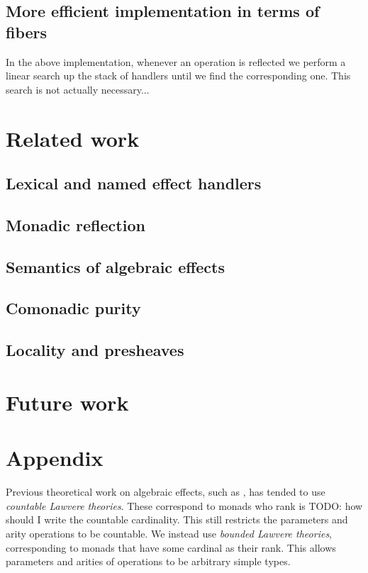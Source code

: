 \documentclass[acmsmall, screen, nonacm]{acmart}
\theoremstyle{definition}
\newcommand{\todo}[1]{{\color{red}TODO: #1}}
\begin{document}
\subsection{More efficient implementation in terms of fibers}

In the above implementation, whenever an operation is reflected we
perform a linear search up the stack of handlers until we find the
corresponding one. This search is not actually necessary...

\section{Related work}
\label{sec:related-work}

\subsection{Lexical and named effect handlers}

\subsection{Monadic reflection}

\subsection{Semantics of algebraic effects}

\subsection{Comonadic purity}

\subsection{Locality and presheaves}

\section{Future work}
\label{sec:future-work}






\section{Appendix}

Previous theoretical work on algebraic effects, such as \cite{??},
has tended to use \emph{countable Lawvere theories}. These correspond to
monads who rank is \todo{how should I write the countable
  cardinality}. This still restricts the parameters and arity operations
to be countable. We instead use \emph{bounded Lawvere
  theories}, corresponding to monads that have some cardinal as their
rank. This allows parameters and arities of operations to be arbitrary
simple types.
\end{document}
